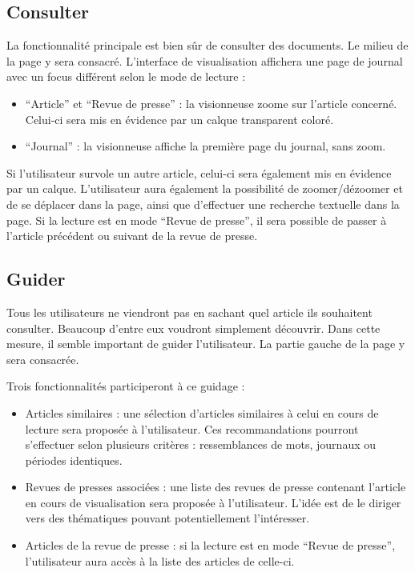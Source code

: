 \subsection{Consulter}
\label{sec:consultation_consulter}
La fonctionnalité principale est bien sûr de consulter des documents. Le milieu de la page y sera consacré.
L’interface de visualisation affichera une page de journal avec un focus différent selon le mode de lecture :
\begin{itemize}
\item “Article” et “Revue de presse” : la visionneuse zoome sur l’article concerné. Celui-ci sera mis en évidence par un calque transparent coloré.
\item “Journal” : la visionneuse affiche la première page du journal, sans zoom.
\end{itemize}
Si l’utilisateur survole un autre article, celui-ci sera également mis en évidence par un calque.
	L’utilisateur aura également la possibilité de zoomer/dézoomer et de se déplacer dans la page, ainsi que d’effectuer une recherche textuelle dans la page. Si la lecture est en mode “Revue de presse”, il sera possible de passer à l’article précédent ou suivant de la revue de presse.

\subsection{Guider}
\label{sec:consultation_guider}

	Tous les utilisateurs ne viendront pas en sachant quel article ils souhaitent consulter. Beaucoup d’entre eux voudront simplement découvrir. Dans cette mesure, il semble important de guider l’utilisateur. La partie gauche de la page y sera consacrée.

	Trois fonctionnalités participeront à ce guidage :
\begin{itemize}
\item Articles similaires : une sélection d’articles similaires à celui en cours de lecture sera proposée à l’utilisateur. Ces recommandations pourront s’effectuer selon plusieurs critères : ressemblances de mots, journaux ou périodes identiques.
\item Revues de presses associées : une liste des revues de presse contenant l’article en cours de visualisation sera proposée à l’utilisateur. L’idée est de le diriger vers des thématiques pouvant potentiellement l’intéresser.
\item Articles de la revue de presse : si la lecture est en mode “Revue de presse”, l’utilisateur aura accès à la liste des articles de celle-ci.
\end{itemize}


